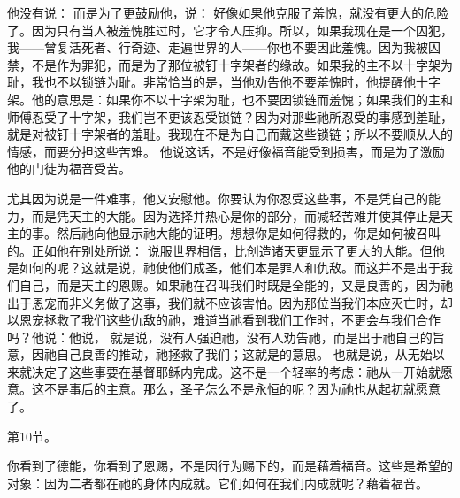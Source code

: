 他没有说： 而是为了更鼓励他，说： 好像如果他克服了羞愧，就没有更大的危险了。因为只有当人被羞愧胜过时，它才令人压抑。所以，如果我现在是一个囚犯，我——曾复活死者、行奇迹、走遍世界的人——你也不要因此羞愧。因为我被囚禁，不是作为罪犯，而是为了那位被钉十字架者的缘故。如果我的主不以十字架为耻，我也不以锁链为耻。非常恰当的是，当他劝告他不要羞愧时，他提醒他十字架。他的意思是：如果你不以十字架为耻，也不要因锁链而羞愧；如果我们的主和师傅忍受了十字架，我们岂不更该忍受锁链？因为对那些祂所忍受的事感到羞耻，就是对被钉十字架者的羞耻。我现在不是为自己而戴这些锁链；所以不要顺从人的情感，而要分担这些苦难。 他说这话，不是好像福音能受到损害，而是为了激励他的门徒为福音受苦。\par

\par

尤其因为说是一件难事，他又安慰他。你要认为你忍受这些事，不是凭自己的能力，而是凭天主的大能。因为选择并热心是你的部分，而减轻苦难并使其停止是天主的事。然后祂向他显示祂大能的证明。想想你是如何得救的，你是如何被召叫的。正如他在别处所说： 说服世界相信，比创造诸天更显示了更大的大能。但他是如何的呢？这就是说，祂使他们成圣，他们本是罪人和仇敌。而这并不是出于我们自己，而是天主的恩赐。如果祂在召叫我们时既是全能的，又是良善的，因为祂出于恩宠而非义务做了这事，我们就不应该害怕。因为那位当我们本应灭亡时，却以恩宠拯救了我们这些仇敌的祂，难道当祂看到我们工作时，不更会与我们合作吗？他说：他说， 就是说，没有人强迫祂，没有人劝告祂，而是出于祂自己的旨意，因祂自己良善的推动，祂拯救了我们；这就是的意思。 也就是说，从无始以来就决定了这些事要在基督耶稣内完成。这不是一个轻率的考虑：祂从一开始就愿意。这不是事后的主意。那么，圣子怎么不是永恒的呢？因为祂也从起初就愿意了。\par

第10节。\par

你看到了德能，你看到了恩赐，不是因行为赐下的，而是藉着福音。这些是希望的对象：因为二者都在祂的身体内成就。它们如何在我们内成就呢？藉着福音。\par

